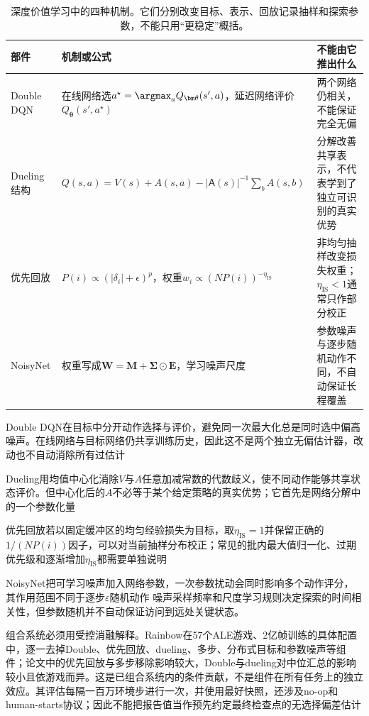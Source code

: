 \begin{table}[t]
  \centering
  \small
  \begin{tabularx}{\linewidth}{>{\raggedright\arraybackslash}p{26mm} >{\raggedright\arraybackslash}X >{\raggedright\arraybackslash}X}
    \toprule
    部件 & 机制或公式 & 不能由它推出什么 \\
    \midrule
    Double DQN & 在线网络选$a^\star=\argmax_aQ_{\bm\theta}(s',a)$，延迟网络评价$Q_{\bar{\bm\theta}}(s',a^\star)$ & 两个网络仍相关，不能保证完全无偏 \\
    Dueling结构 & $Q(s,a)=V(s)+A(s,a)-|\mathsf A(s)|^{-1}\sum_bA(s,b)$ & 分解改善共享表示，不代表学到了独立可识别的真实优势 \\
    优先回放 & $P(i)\propto(|\delta_i|+\epsilon)^p$，权重$w_i\propto(NP(i))^{-\eta_{\mathrm{IS}}}$ & 非均匀抽样改变损失权重；$\eta_{\mathrm{IS}}<1$通常只作部分校正 \\
    NoisyNet & 权重写成$\bm W=\bm M+\bm\Sigma\odot\bm E$，学习噪声尺度 & 参数噪声与逐步随机动作不同，不自动保证长程覆盖 \\
    \bottomrule
  \end{tabularx}
  \caption{深度价值学习中的四种机制。它们分别改变目标、表示、回放记录抽样和探索参数，不能只用“更稳定”概括。}
  \label{tab:rl-learning-dqn-components}
\end{table}

Double DQN在目标中分开动作选择与评价，避免同一次最大化总是同时选中偏高噪声。在线网络与目标网络仍共享训练历史，因此这不是两个独立无偏估计器，改动也不自动消除所有过估计

Dueling用均值中心化消除$V$与$A$任意加减常数的代数歧义，使不同动作能够共享状态评价。但中心化后的$A$不必等于某个给定策略的真实优势；它首先是网络分解中的一个参数化量

优先回放若以固定缓冲区的均匀经验损失为目标，取$\eta_{\mathrm{IS}}=1$并保留正确的$1/(NP(i))$因子，可以对当前抽样分布校正；常见的批内最大值归一化、过期优先级和逐渐增加$\eta_{\mathrm{IS}}$都需要单独说明

NoisyNet把可学习噪声加入网络参数，一次参数扰动会同时影响多个动作评分，其作用范围不同于逐步$\varepsilon$随机动作
噪声采样频率和尺度学习规则决定探索的时间相关性，但参数随机并不自动保证访问到远处关键状态。

组合系统必须用受控消融解释。Rainbow在57个ALE游戏、2亿帧训练的具体配置中，逐一去掉Double、优先回放、dueling、多步、分布式目标和参数噪声等组件；论文中的优先回放与多步移除影响较大，Double与dueling对中位汇总的影响较小且依游戏而异。这是已组合系统内的条件贡献，不是组件在所有任务上的独立效应。其评估每隔一百万环境步进行一次，并使用最好快照，还涉及no-op和human-starts协议；因此不能把报告值当作预先约定最终检查点的无选择偏差估计

